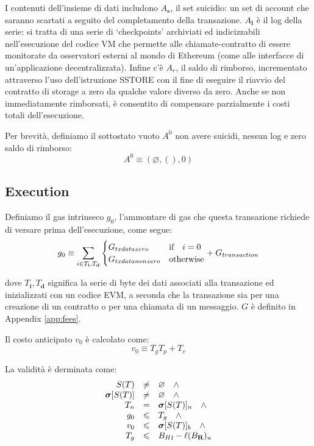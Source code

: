 \documentclass[9pt,oneside]{amsart}
\begin{document}
\begin{multicols}{2}
I contenuti dell'insieme di dati includono $A_\mathbf{s}$, il set suicidio: un set di account che saranno scartati a seguito del completamento della transazione. $A_\mathbf{l}$ è il log della serie: si tratta di una serie di `checkpoints' archiviati ed indicizzabili nell'esecuzione del codice VM che permette alle chiamate-contratto di essere monitorate da osservatori esterni al mondo di Ethereum (come alle interfacce di un'applicazione decentralizzata). Infine c'è $A_r$, il saldo di rimborso, incrementato attraverso l'uso dell'istruzione {\small SSTORE} con il fine di eseguire il riavvio del contratto di storage a zero da qualche valore diverso da zero. Anche se non immediatamente rimborsati, è consentito di compensare parzialmente i costi totali dell'esecuzione.

Per brevità, definiamo il sottostato vuoto $A^0$ non avere suicidi, nessun log e zero saldo di rimborso:
\begin{equation}
A^0 \equiv (\varnothing, (), 0)
\end{equation}

\subsection{Execution}
Definiamo il gas intrinseco $g_0$, l'ammontare di gas che questa transazione richiede di versare prima dell'esecuzione, come segue:
\begin{equation}
g_0 \equiv \sum_{i \in T_\mathbf{i}, T_\mathbf{d}} \begin{cases} G_{txdatazero} & \text{if} \quad i = 0 \\ G_{txdatanonzero} & \text{otherwise} \end{cases} + G_{transaction}\\
\end{equation}

dove $T_\mathbf{i},T_\mathbf{d}$ significa la serie di byte dei dati associati alla transazione ed inizializzati con un codice EVM, a seconda che la transazione sia per una creazione di un contratto o per una chiamata di un messaggio. $G$ è definito in Appendix \ref{app:fees}.


Il costo anticipato $v_0$ è calcolato come:
\begin{equation}
v_0 \equiv T_g T_p + T_v
\end{equation}

La validità è derminata come:
\begin{equation}
\begin{array}[t]{rcl}
S(T) & \neq & \varnothing \quad \wedge \\
\boldsymbol{\sigma}[S(T)] & \neq & \varnothing \quad \wedge \\
T_n & = & \boldsymbol{\sigma}[S(T)]_n \quad \wedge \\
g_0 & \leqslant & T_g \quad \wedge \\ 
v_0 & \leqslant & \boldsymbol{\sigma}[S(T)]_b \quad \wedge \\
T_g & \leqslant & {B_H}_l - \ell(B_\mathbf{R})_u
\end{array}
\end{equation}


\end{multicols}
\end{document}
